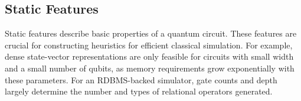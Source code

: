 
 

\subsection{Static Features}
Static features describe basic properties of a quantum circuit. These features
are crucial for constructing heuristics for efficient classical simulation.
For example, dense state-vector representations are only feasible for circuits
with small width and a small number of qubits, as memory requirements grow
exponentially with these parameters. For an RDBMS-backed simulator, gate counts
and depth largely determine the number and types of relational operators
generated.

